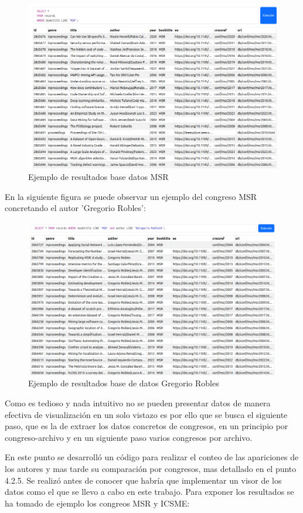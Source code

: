 \documentclass[a4paper, 12pt]{book}
\begin{document}
\begin{figure}[h]
  \centering
  \includegraphics[width=11.5cm, keepaspectratio]{img/ej_sqlite_MSR.png}
  \caption{Ejemplo de resultados base datos MSR}
  \label{fig:ej_sqlite}
\end{figure}

En la siguiente figura se puede observar un ejemplo del congreso MSR concretando el autor 'Gregorio Robles':

\begin{figure}[h]
  \centering
  \includegraphics[width=11.5cm, keepaspectratio]{img/ej_bd_GR.png}
  \caption{Ejemplo de resultados base de datos Gregorio Robles}
  \label{fig:ej_GR}
\end{figure}

Como es tedioso y nada intuitivo no se pueden presentar datos de manera efectiva de visualización en un solo vistazo es por ello que se busca el siguiente paso, que es la de extraer los datos concretos de congresos, en un principio por congreso-archivo y en un siguiente paso varios congresos por archivo.

En este punto se desarrolló un código para realizar el conteo de las apariciones de los autores y mas tarde su comparación por congresos, mas detallado en el punto 4.2.5.
Se realizó antes de conocer que habría que implementar un visor de los datos como el que se llevo a cabo en este trabajo. Para exponer los resultados se ha tomado de ejemplo los congreos MSR y ICSME:
\end{document}
